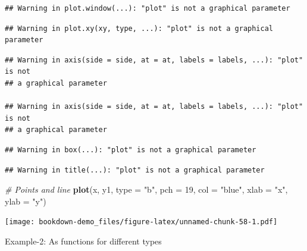 \documentclass[]{book}
\newenvironment{Shaded}{\begin{snugshade}}{\end{snugshade}}
\newcommand{\KeywordTok}[1]{\textcolor[rgb]{0.13,0.29,0.53}{\textbf{#1}}}
\newcommand{\DataTypeTok}[1]{\textcolor[rgb]{0.13,0.29,0.53}{#1}}
\newcommand{\DecValTok}[1]{\textcolor[rgb]{0.00,0.00,0.81}{#1}}
\newcommand{\StringTok}[1]{\textcolor[rgb]{0.31,0.60,0.02}{#1}}
\newcommand{\CommentTok}[1]{\textcolor[rgb]{0.56,0.35,0.01}{\textit{#1}}}
\newcommand{\NormalTok}[1]{#1}
\begin{document}
\begin{verbatim}
## Warning in plot.window(...): "plot" is not a graphical parameter
\end{verbatim}

\begin{verbatim}
## Warning in plot.xy(xy, type, ...): "plot" is not a graphical parameter
\end{verbatim}

\begin{verbatim}
## Warning in axis(side = side, at = at, labels = labels, ...): "plot" is not
## a graphical parameter

## Warning in axis(side = side, at = at, labels = labels, ...): "plot" is not
## a graphical parameter
\end{verbatim}

\begin{verbatim}
## Warning in box(...): "plot" is not a graphical parameter
\end{verbatim}

\begin{verbatim}
## Warning in title(...): "plot" is not a graphical parameter
\end{verbatim}

\begin{Shaded}
\begin{Highlighting}[]
\CommentTok{# Points and line}
\KeywordTok{plot}\NormalTok{(x, y1, }\DataTypeTok{type =} \StringTok{"b"}\NormalTok{, }\DataTypeTok{pch =} \DecValTok{19}\NormalTok{, }
     \DataTypeTok{col =} \StringTok{"blue"}\NormalTok{, }\DataTypeTok{xlab =} \StringTok{"x"}\NormalTok{, }\DataTypeTok{ylab =} \StringTok{"y"}\NormalTok{)}
\end{Highlighting}
\end{Shaded}

\texttt{[image: bookdown-demo\_files/figure-latex/unnamed-chunk-58-1.pdf]}

Example-2: As functions for different types
\end{document}
